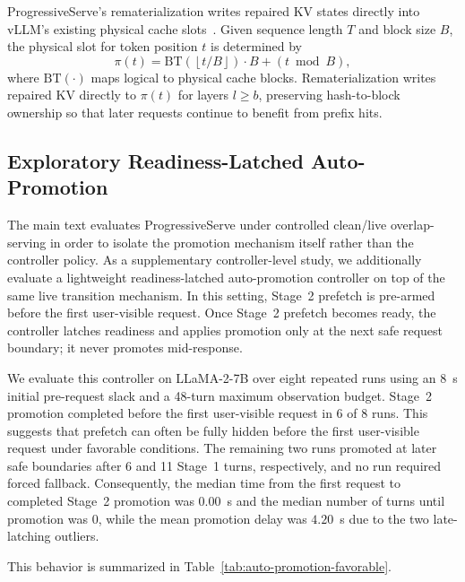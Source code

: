 \documentclass[sigplan,anonymous,review,nonacm]{acmart}
\begin{document}
ProgressiveServe's rematerialization writes repaired KV states directly into vLLM's existing physical cache slots~\cite{vllm_prefix_docs}. Given sequence length $T$ and block size $B$, the physical slot for token position $t$ is determined by
\begin{equation}
\pi(t)=\mathrm{BT}\!\left(\left\lfloor t/B \right\rfloor\right)
\cdot B + (t \bmod B),
\label{eq:slot_mapping}
\end{equation}
where $\mathrm{BT}(\cdot)$ maps logical to physical cache blocks. Rematerialization writes repaired KV directly to $\pi(t)$ for layers $l \ge b$, preserving hash-to-block ownership so that later requests continue to benefit from prefix hits.



\subsection{Exploratory Readiness-Latched Auto-Promotion}
\label{app:auto-promotion}

The main text evaluates ProgressiveServe under controlled clean/live overlap-serving in order to isolate the promotion mechanism itself rather than the controller policy.
As a supplementary controller-level study, we additionally evaluate a lightweight readiness-latched auto-promotion controller on top of the same live transition mechanism.
In this setting, Stage~2 prefetch is pre-armed before the first user-visible request.
Once Stage~2 prefetch becomes ready, the controller latches readiness and applies promotion only at the next safe request boundary; it never promotes mid-response.

We evaluate this controller on LLaMA-2-7B over eight repeated runs using an 8~s initial pre-request slack and a 48-turn maximum observation budget.
Stage~2 promotion completed before the first user-visible request in 6 of 8 runs.
This suggests that prefetch can often be fully hidden before the first user-visible request under favorable conditions.
The remaining two runs promoted at later safe boundaries after 6 and 11 Stage~1 turns, respectively, and no run required forced fallback.
Consequently, the median time from the first request to completed Stage~2 promotion was \(0.00\)~s and the median number of turns until promotion was \(0\), while the mean promotion delay was \(4.20\)~s due to the two late-latching outliers.

This behavior is summarized in Table~\ref{tab:auto-promotion-favorable}.
\end{document}
